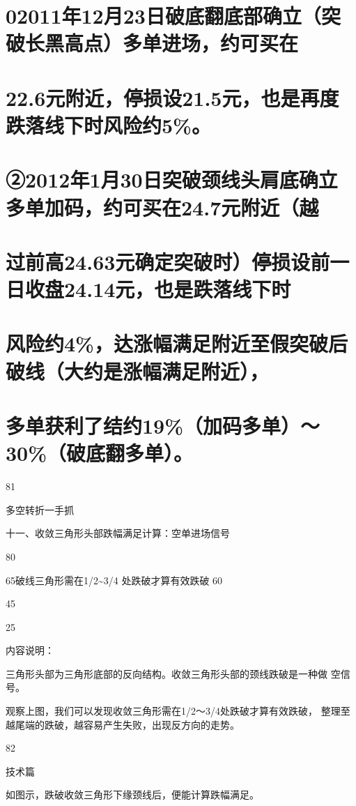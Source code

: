 \documentclass{article}
\begin{document}
\section{02011年12月23日破底翻底部确立（突破长黑高点）多单进场，约可买在}

\section{22.6元附近，停损设21.5元，也是再度跌落线下时风险约5\%。}

\section{②2012年1月30日突破颈线头肩底确立多单加码，约可买在24.7元附近（越}

\section{过前高24.63元确定突破时）停损设前一日收盘24.14元，也是跌落线下时}

\section{风险约4\%，达涨幅满足附近至假突破后破线（大约是涨幅满足附近），}

\section{多单获利了结约19\%（加码多单）～30\%（破底翻多单）。}

81

\clearpage

多空转折一手抓

十一、收敛三角形头部跌幅满足计算：空单进场信号

80

65破线三角形需在1/2\textasciitilde{}3/4 处跌破才算有效跌破 60

45

25

内容说明：

三角形头部为三角形底部的反向结构。收敛三角形头部的颈线跌破是一种做 空信号。

观察上图，我们可以发现收敛三角形需在1/2～3/4处跌破才算有效跌破， 整理至越尾端的跌破，越容易产生失败，出现反方向的走势。

82

\clearpage

技术篇

如图示，跌破收敛三角形下缘颈线后，便能计算跌幅满足。
\end{document}

